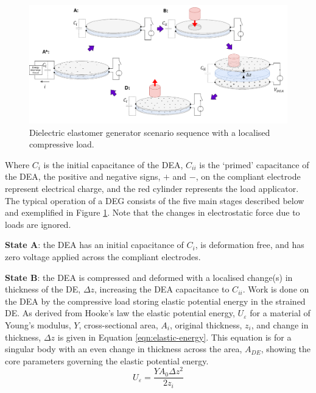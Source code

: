 \begin{figure}[H]
	\centering
	\includegraphics[width = \textwidth]{Figures/DEA-EIT-DEG_sequence.png}
	\vspace{0.2cm}
	\caption{Dielectric elastomer generator scenario sequence with a localised compressive load.}
	\label{fig:dea_eit_deg}
\end{figure}
Where $C_i$ is the initial capacitance of the DEA, $C_{ii}$ is the `primed' capacitance of the DEA, the positive and negative signs, $+$ and $-$, on the compliant electrode represent electrical charge, and the red cylinder represents the load applicator. The typical operation of a DEG consists of the five main stages described below and exemplified in Figure \ref{fig:dea_eit_deg}. Note that the changes in electrostatic force due to loads are ignored.

\textbf{State A}: the DEA has an initial capacitance of $C_i$, is deformation free, and has zero voltage applied across the compliant electrodes.

\textbf{State B}: the DEA is compressed and deformed with a localised change(s) in thickness of the DE, $\Delta z$, increasing the DEA capacitance to $C_{ii}$. Work is done on the DEA by the compressive load storing elastic potential energy in the strained DE.
As derived from Hooke's law the elastic potential energy, $U_{\varepsilon}$ for a material of Young's modulus, $Y$, cross-sectional area, $A_i$, original thickness, $z_i$, and change in thickness, $\Delta z$ is given in Equation \ref{eqn:elastic-energy}. This equation is for a singular body with an even change in thickness across the area, $A_{DE}$, showing the core parameters governing the elastic potential energy.
\begin{equation}
	U_{\varepsilon} = \frac{YA_0\Delta z^2}{2z_i}
	\label{eqn:elastic-energy}
\end{equation}

